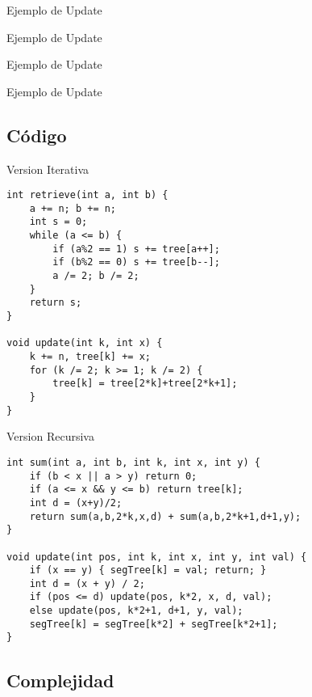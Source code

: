 \documentclass{beamer}
\begin{document}
\begin{frame}{Ejemplo de Update}

\end{frame}

\begin{frame}{Ejemplo de Update}

\end{frame}

\begin{frame}{Ejemplo de Update}

\end{frame}

\begin{frame}{Ejemplo de Update}

\end{frame}

\subsection{Código}

\begin{frame}[fragile]{Version Iterativa}
\begin{lstlisting}
int retrieve(int a, int b) {
    a += n; b += n;
    int s = 0;
    while (a <= b) {
        if (a%2 == 1) s += tree[a++];
        if (b%2 == 0) s += tree[b--];
        a /= 2; b /= 2;
    }
    return s;
}

void update(int k, int x) {
    k += n, tree[k] += x;
    for (k /= 2; k >= 1; k /= 2) {
        tree[k] = tree[2*k]+tree[2*k+1];
    }
}
\end{lstlisting}
\end{frame}

\begin{frame}[fragile]{Version Recursiva}
\begin{lstlisting}
int sum(int a, int b, int k, int x, int y) {
    if (b < x || a > y) return 0;
    if (a <= x && y <= b) return tree[k];
    int d = (x+y)/2;
    return sum(a,b,2*k,x,d) + sum(a,b,2*k+1,d+1,y);
}
      
void update(int pos, int k, int x, int y, int val) {
    if (x == y) { segTree[k] = val; return; }
    int d = (x + y) / 2;
    if (pos <= d) update(pos, k*2, x, d, val);
    else update(pos, k*2+1, d+1, y, val);
    segTree[k] = segTree[k*2] + segTree[k*2+1];
}

\end{lstlisting}
\end{frame}

\subsection{Complejidad}
\end{document}
